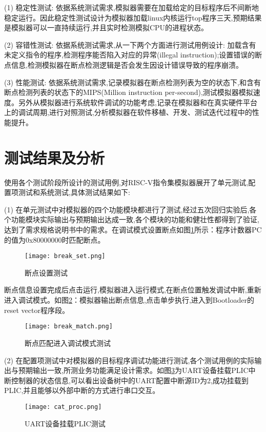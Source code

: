 (1)	稳定性测试: 依据系统测试需求,模拟器需要在加载给定的目标程序后不间断地稳定运行。因此稳定性测试设计为模拟器加载linux内核运行top程序三天,预期结果是模拟器可以一直持续运行,并且实时检测模拟CPU的进程状态。


(2)	容错性测试: 依据系统测试需求,从一下两个方面进行测试用例设计: 加载含有未定义指令的程序,检测程序能否陷入对应的异常(illegal instruction);设置错误的断点信息,检测模拟器在断点检测逻辑是否会发生因设计错误导致的程序崩溃。


(3)	性能测试: 依据系统测试需求,记录模拟器在断点检测列表为空的状态下,和含有断点检测列表的状态下的MIPS(Million instruction per-second),测试模拟器模拟速度。另外从模拟器进行系统软件调试的功能考虑,记录在模拟器和在真实硬件平台上的调试周期,进行对照测试,分析模拟器在软件移植、开发、测试迭代过程中的性能提升。

\section{测试结果及分析}
使用各个测试阶段所设计的测试用例,对RISC-V指令集模拟器展开了单元测试,配置项测试和系统测试,具体测试结果如下:


(1) 在单元测试中对模拟器的四个功能模块都进行了测试,经过五次回归实验后,各个功能模块实际输出与预期输出达成一致,各个模块的功能和健壮性都得到了验证,达到了需求规格说明书中的需求。在调试模式设置断点如图\ref{fig:break_set}所示：程序计数器PC的值为0x80000000时匹配断点。
\begin{figure}[H]
  \centering
  \texttt{[image: break\_set.png]}
  \caption{断点设置测试}
  \label{fig:break_set}
\end{figure}


断点信息设置完成后点击运行,模拟器进入运行模式,在断点位置触发调试中断,重新进入调试模式。如图\ref{fig:break_match}：模拟器输出断点信息,点击单步执行,进入到Bootloader的reset vector程序段。
\begin{figure}[H]
  \centering
  \texttt{[image: break\_match.png]}
  \caption{断点匹配进入调试模式测试}
  \label{fig:break_match}
\end{figure}


(2) 在配置项测试中对模拟器的目标程序调试功能进行测试,各个测试用例的实际输出与预期输出一致,所测业务功能满足设计需求。如图\ref{fig:cat_proc}为UART设备挂载PLIC中断控制器的状态信息,可以看出设备树中的UART配置中断源ID为2,成功挂载到PLIC,并且能够以外部中断的方式进行串口交互。
\begin{figure}[H]
  \centering
  \texttt{[image: cat\_proc.png]}
  \caption{UART设备挂载PLIC测试}
  \label{fig:cat_proc}
\end{figure}


